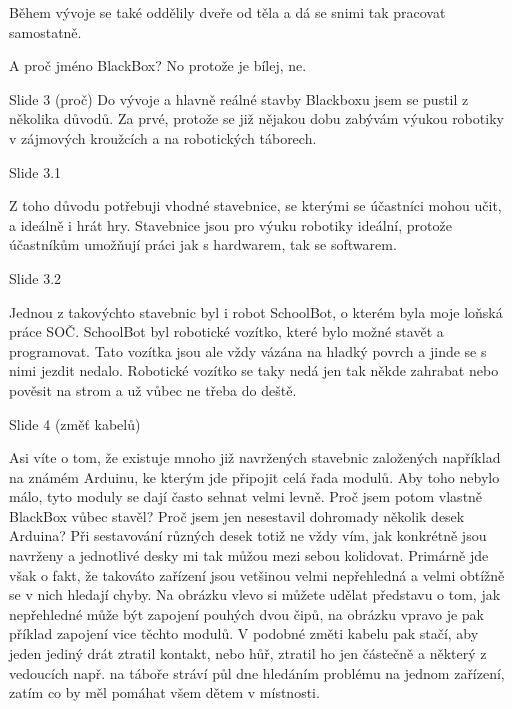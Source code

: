 Během vývoje se také oddělily dveře od těla a dá se snimi tak pracovat samostatně.

A proč jméno BlackBox? No protože je bílej, ne. %


Slide 3 (proč)
Do vývoje a hlavně reálné stavby Blackboxu jsem se pustil z několika důvodů. 
Za prvé, protože se již nějakou dobu zabývám 
výukou robotiky v zájmových kroužcích a na robotických táborech. 

    Slide 3.1

    Z toho důvodu potřebuji 
    vhodné stavebnice, se kterými se účastníci mohou učit, a ideálně i hrát hry.
    Stavebnice jsou pro výuku robotiky ideální, protože účastníkům umožňují práci jak 
    s hardwarem, tak se softwarem. 

    Slide 3.2

    Jednou z takovýchto stavebnic byl i robot SchoolBot, o kterém byla moje loňská práce SOČ.
    SchoolBot byl robotické vozítko, které bylo možné stavět a programovat.  
    Tato vozítka jsou ale vždy vázána na hladký povrch a jinde se s nimi jezdit nedalo.
    Robotické vozítko se taky nedá jen tak někde zahrabat nebo pověsit na strom a už vůbec ne třeba do deště. 


Slide 4 (změť kabelů)

Asi víte o tom, že existuje mnoho již navržených stavebnic založených například na známém Arduinu, 
ke kterým jde připojit celá řada modulů. Aby toho nebylo málo, tyto moduly se dají často sehnat velmi levně. 
Proč jsem potom vlastně BlackBox vůbec stavěl? Proč jsem jen nesestavil dohromady několik desek Arduina? 
Při sestavování různých desek
totiž ne vždy vím, jak konkrétně jsou navrženy a jednotlivé desky mi tak můžou mezi sebou kolidovat.
Primárně jde však o fakt, že takováto zařízení jsou vetšinou velmi nepřehledná a velmi obtížně se v nich 
hledají chyby. Na obrázku vlevo si můžete udělat představu o tom, jak nepřehledné může být zapojení 
pouhých dvou čipů, na obrázku vpravo je pak příklad zapojení vice těchto modulů. 
V podobné změti kabelu pak stačí, aby jeden jediný drát 
ztratil kontakt, nebo hůř, ztratil ho jen částečně a některý z vedoucích 
např. na táboře stráví půl dne hledáním problému 
na jednom zařízení, zatím co by měl pomáhat všem dětem v místnosti.

